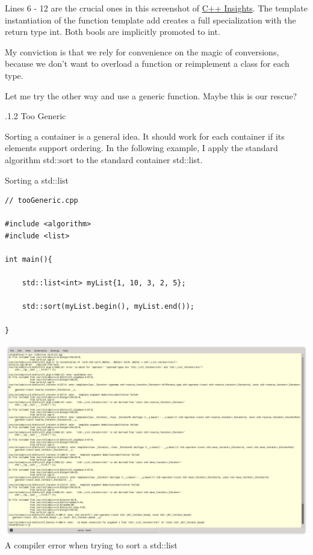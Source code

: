Lines 6 - 12 are the crucial ones in this screenshot of \href{https://cppinsights.io/}{C++ Insights}. The template instantiation of the function template add creates a full specialization with the return type int. Both bools are implicitly promoted to int.

My conviction is that we rely for convenience on the magic of conversions, because we don’t want to overload a function or reimplement a class for each type.

Let me try the other way and use a generic function. Maybe this is our rescue?

.1.2\hspace{0.2cm} Too Generic

Sorting a container is a general idea. It should work for each container if its elements support ordering. In the following example, I apply the standard algorithm std::sort to the standard container std::list.

\noindent
Sorting a std::list
\begin{lstlisting}[style=styleCXX]
// tooGeneric.cpp

#include <algorithm>
#include <list>

int main(){
	
	std::list<int> myList{1, 10, 3, 2, 5};
	
	std::sort(myList.begin(), myList.end());
	
}
\end{lstlisting}

\begin{center}
\includegraphics[width=1.0\textwidth]{content/3/chapter4/images/4.png}\\
A compiler error when trying to sort a std::list
\end{center}

